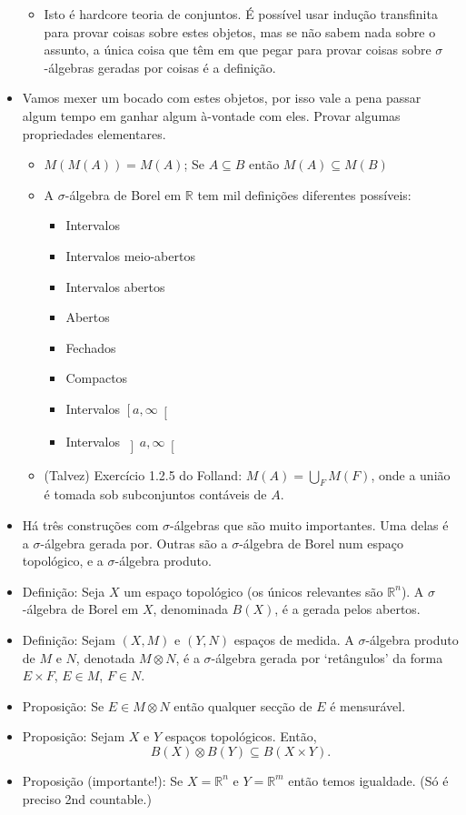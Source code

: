 \documentclass{article}
\newcommand{\R}{\mathbb{R}}
\begin{document}
\begin{itemize}
\begin{itemize}
\item Isto é hardcore teoria de conjuntos. É possível usar indução transfinita para provar coisas sobre estes objetos, mas se não sabem nada sobre o assunto, a única coisa que têm em que pegar para provar coisas sobre $\sigma$-álgebras geradas por coisas é a definição.
\end{itemize}
\item Vamos mexer um bocado com estes objetos, por isso vale a pena passar algum tempo em ganhar algum à-vontade com eles. Provar algumas propriedades elementares.
\begin{itemize}
\item $M(M(A)) = M(A)$; Se $A \subseteq B$ então $M(A) \subseteq M(B)$
\item A $\sigma$-álgebra de Borel em $\R$ tem mil definições diferentes possíveis:
\begin{itemize}
\item Intervalos
\item Intervalos meio-abertos
\item Intervalos abertos
\item Abertos
\item Fechados
\item Compactos
\item Intervalos $\left[a, \infty\right[$
\item Intervalos $\left]a, \infty\right[$
\end{itemize}
\item (Talvez) Exercício 1.2.5 do Folland: $M(A) = \bigcup_F M(F)$, onde a união é tomada sob subconjuntos contáveis de $A$.
\end{itemize}
\item Há três construções com $\sigma$-álgebras que são muito importantes. Uma delas é a $\sigma$-álgebra gerada por. Outras são a $\sigma$-álgebra de Borel num espaço topológico, e a $\sigma$-álgebra produto.
\item Definição: Seja $X$ um espaço topológico (os únicos relevantes são $\R^n$). A $\sigma$-álgebra de Borel em $X$, denominada $B(X)$, é a gerada pelos abertos.
\item Definição: Sejam $(X,M)$ e $(Y,N)$ espaços de medida. A $\sigma$-álgebra produto de $M$ e $N$, denotada $M \otimes N$, é a $\sigma$-álgebra gerada por `retângulos' da forma $E \times F$, $E \in M$, $F \in N$.
\item Proposição: Se $E \in M \otimes N$ então qualquer secção de $E$ é mensurável.
\item Proposição: Sejam $X$ e $Y$ espaços topológicos. Então,
\[B(X) \otimes B(Y) \subseteq B(X \times Y).\]
\item Proposição (importante!): Se $X = \R^n$ e $Y = \R^m$ então temos igualdade. (Só é preciso 2nd countable.)


\end{itemize}
\end{document}
